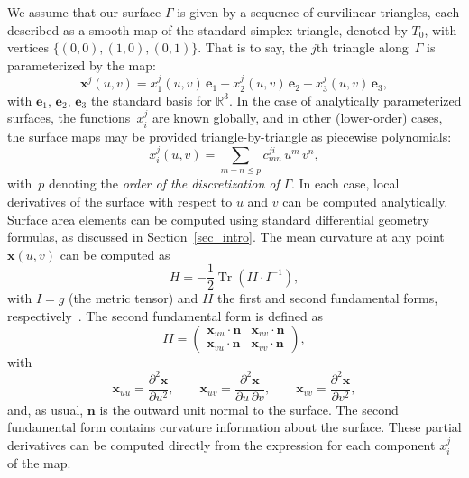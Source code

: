 \documentclass[11pt]{article}
\DeclareMathOperator{\Tr}{Tr}
\newcommand{\exx}{\mathbf{e}_1}
\newcommand{\eyy}{\mathbf{e}_2}
\newcommand{\ezz}{\mathbf{e}_3}
\newcommand{\bn}{\bm n}
\newcommand{\bx}{\bm x}
\numberwithin{equation}{section}
\begin{document}
We assume that our surface $\Gamma$ is given by a sequence of curvilinear
triangles, each described as a 
smooth map of the standard simplex triangle, denoted by $T_0$, with vertices
$\{(0,0), (1,0), (0,1) \}$.
That is to say, the
$j$th triangle along~$\Gamma$ is parameterized by the map:
\begin{equation}\label{eq_xji}
\bx^j(u,v) = x^j_1(u,v) \, \exx + x^j_2(u,v) \, \eyy + x^j_3(u,v) \, \ezz,
\end{equation}
with $\exx$, $\eyy$, $\ezz$ the standard basis for $\mathbb R^3$.  In
the case of analytically parameterized surfaces, the functions~$x^j_i$
are
known globally, and in other (lower-order)
cases, the surface maps may be provided triangle-by-triangle
as piecewise polynomials:
\begin{equation}\label{eq_tripols}
x_i^j(u,v) = \sum_{m+n \leq p} c^{ji}_{mn} \, u^m \, v^n,
\end{equation}
with~$p$ denoting the \emph{order of the discretization of} $\Gamma$.
In each case, local derivatives of the surface with respect to $u$ and
$v$ can be
computed analytically.
Surface area
elements can be computed using standard differential geometry
formulas, as discussed in Section~\ref{sec_intro}.
The mean curvature at any point $\bx(u,v)$ can be computed
as
\begin{equation}
H = -\frac{1}{2} \Tr\left({II} \cdot {I}^{-1} \right),
\end{equation}
with $I = g$ (the metric tensor)
and $II$ the first and second fundamental forms,
respectively~\cite{docarmo_1976}.
The second fundamental form is defined as
\begin{equation}
  II =
  \begin{pmatrix}
    \bx_{uu} \cdot \bn &     \bx_{uv} \cdot \bn \\
    \bx_{vu} \cdot \bn &      \bx_{vv} \cdot \bn
  \end{pmatrix},
\end{equation}
with
\begin{equation}
\bx_{uu} = \frac{\partial^2 \bx}{\partial u^2}, \qquad
\bx_{uv} = \frac{\partial^2 \bx}{\partial u \, \partial v}, \qquad
\bx_{vv} = \frac{\partial^2 \bx}{\partial v^2},
\end{equation}
and, as usual, $\bn$ is the outward unit normal to the surface.
The second fundamental form contains 
curvature information about the surface.
These partial derivatives can be computed directly from the expression
for each component $x^j_i$ of the map.
\end{document}
